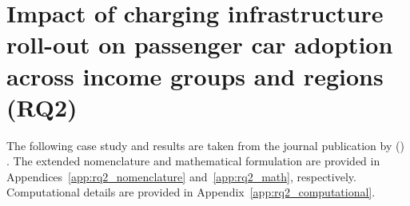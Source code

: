






\section{Impact of charging infrastructure roll-out on passenger car adoption across income groups and regions (RQ2)}\label{sec:rq2_results}

The following case study and results are taken from the journal publication by \citeauthor{GOLAB2026PublicCharger} (\citeyear{GOLAB2026PublicCharger}) \cite{GOLAB2026PublicCharger}. The extended nomenclature and mathematical formulation are provided in Appendices~\ref{app:rq2_nomenclature} and~\ref{app:rq2_math}, respectively. Computational details are provided in Appendix~\ref{app:rq2_computational}.

